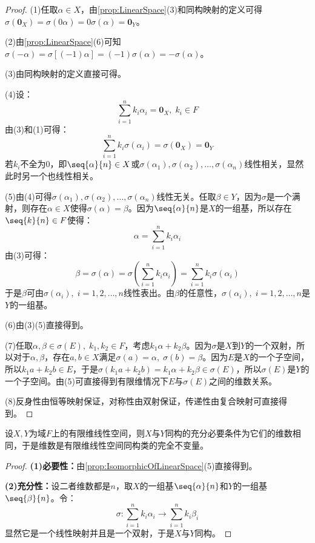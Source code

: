\begin{proof}
	(1)任取$\alpha\in X$，由\cref{prop:LinearSpace}(3)和同构映射的定义可得$\sigma(\mathbf{0}_X)=\sigma(0\alpha)=0\sigma(\alpha)=\mathbf{0}_Y$。\par
	(2)由\cref{prop:LinearSpace}(6)可知$\sigma(-\alpha)=\sigma[(-1)\alpha]=(-1)\sigma(\alpha)=-\sigma(\alpha)$。\par
	(3)由同构映射的定义直接可得。\par
	(4)设：
	\begin{equation*}
		\sum_{i=1}^{n}k_i\alpha_i=\mathbf{0}_X,\;k_i\in F
	\end{equation*}
	由(3)和(1)可得：
	\begin{equation*}
		\sum_{i=1}^{n}k_i\sigma(\alpha_i)=\sigma(\mathbf{0}_X)=\mathbf{0}_Y
	\end{equation*}
	若$k_i$不全为$0$，即$\seq{\alpha}{n}\in X$或$\sigma(\alpha_1),\sigma(\alpha_2),\dots,\sigma(\alpha_n)$线性相关，显然此时另一个也线性相关。\par
	(5)由(4)可得$\sigma(\alpha_1),\sigma(\alpha_2),\dots,\sigma(\alpha_n)$线性无关。任取$\beta\in Y$，因为$\sigma$是一个满射，则存在$\alpha\in X$使得$\sigma(\alpha)=\beta$。因为$\seq{\alpha}{n}$是$X$的一组基，所以存在$\seq{k}{n}\in F$使得：
	\begin{equation*}
		\alpha=\sum_{i=1}^{n}k_i\alpha_i
	\end{equation*}
	由(3)可得：
	\begin{equation*}
		\beta=\sigma(\alpha)=\sigma\left(\sum_{i=1}^{n}k_i\alpha_i\right)=\sum_{i=1}^{n}k_i\sigma(\alpha_i)
	\end{equation*}
	于是$\beta$可由$\sigma(\alpha_i),\;i=1,2,\dots,n$线性表出。由$\beta$的任意性，$\sigma(\alpha_i),\;i=1,2,\dots,n$是$Y$的一组基。\par
	(6)由(3)(5)直接得到。\par
	(7)任取$\alpha,\beta\in\sigma(E),\;k_1,k_2\in F$，考虑$k_1\alpha+k_2\beta$。因为$\sigma$是$X$到$Y$的一个双射，所以对于$\alpha,\beta$，存在$a,b\in X$满足$\sigma(a)=\alpha,\;\sigma(b)=\beta$。因为$E$是$X$的一个子空间，所以$k_1a+k_2b\in E$，于是$\sigma(k_1a+k_2b)=k_1\alpha+k_2\beta\in\sigma(E)$，所以$\sigma(E)$是$Y$的一个子空间。由(5)可直接得到有限维情况下$E$与$\sigma(E)$之间的维数关系。\par
	(8)反身性由恒等映射保证，对称性由双射保证，传递性由复合映射可直接得到。
\end{proof}
\begin{theorem}\label{theo:IsomorphicDim}
	设$X,Y$为域$F$上的有限维线性空间，则$X$与$Y$同构的充分必要条件为它们的维数相同，于是维数是有限维线性空间同构类的完全不变量。
\end{theorem}
\begin{proof}
	\textbf{(1)必要性：}由\cref{prop:IsomorphicOfLinearSpace}(5)直接得到。\par
	\textbf{(2)充分性：}设二者维数都是$n$，取$X$的一组基$\seq{\alpha}{n}$和$Y$的一组基$\seq{\beta}{n}$。令：
	\begin{equation*}
		\sigma:\sum_{i=1}^{n}k_i\alpha_i\longrightarrow\sum_{i=1}^{n}k_i\beta_i
	\end{equation*}
	显然它是一个线性映射并且是一个双射，于是$X$与$Y$同构。
\end{proof}

